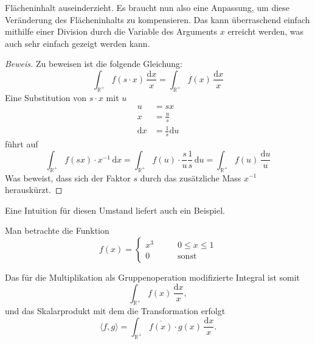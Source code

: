  Flächeninhalt auseinderzieht.
Es braucht nun also eine Anpassung, um diese Veränderung des Flächeninhalts 
zu kompensieren.
Das kann überraschend einfach mithilfe einer Division durch die Variable 
des Arguments $x$ erreicht werden, was auch sehr einfach gezeigt werden 
kann.
\begin{proof}[Beweis]
    Zu beweisen ist die folgende Gleichung:
    \[
        \int_\mathbb{R^+} f(s \cdot x)\,\frac{\mathrm{d}x}{x} 
        = \int_\mathbb{R^+} f(x)\,\frac{\mathrm{d}x}{x}
    \]
    Eine Substitution von $s \cdot x$ mit $u$
    \begin{align*}
        u &= sx \\
        x &= \frac{u}{s} \\
        \mathrm{d}x &= \frac{1}{s} \mathrm{d}u
    \end{align*}
    führt auf
    \[
        \int_\mathbb{R^+} f(sx) \cdot x^{-1}\,\mathrm{d}x 
        = \int_\mathbb{R^+} f(u) \cdot \frac{s}{u} \frac{1}{s}\,\mathrm{d}u
        = \int_\mathbb{R^+} f(u)\,\frac{\mathrm{d}u}{u}
    \]
    Was beweist, dass sich der Faktor $s$ durch das zusätzliche Mass 
    $x^{-1}$ herauskürzt. 
\end{proof}
Eine Intuition für diesen Umstand liefert auch ein Beispiel.
\begin{beispiel}
Man betrachte die Funktion 
\[
f(x) 
= 
\begin{cases}
    x^3 &\qquad 0\leq x\leq 1\\
    0 &\qquad \text{sonst}
\end{cases}
\]
\end{beispiel}
Das für die Multiplikation als Gruppenoperation modifizierte Integral ist 
somit
\begin{equation}
    \int_\mathbb{R^+} f(x)\,\frac{\mathrm{d}x}{x}
    ,
\end{equation}
und das Skalarprodukt mit dem die Transformation erfolgt
\begin{equation}
    \langle f,g \rangle 
    = \int_\mathbb{R^+} \overline{f(x)} \cdot g(x) \,\frac{\mathrm{d}x}{x}
    .
\end{equation}


